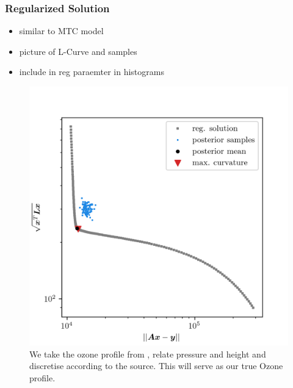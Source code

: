 \subsubsection{Regularized Solution}
\begin{itemize}
	\item similar to MTC model
	\item picture of L-Curve and samples 
	\item include in reg paraemter in histograms
\end{itemize}
\begin{figure}[ht!]
	\centering
	\includegraphics{LCurvePhD.png}
	\caption{We take the ozone profile from \cite{}, relate pressure and height and discretise according to the source.
		This will serve as our true Ozone profile.}
	\label{fig:nter-label}
\end{figure}

